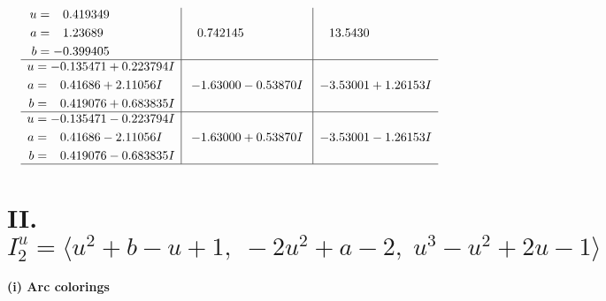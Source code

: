 \documentclass[1p]{elsarticle_modified}
\theoremstyle{definition}
\begin{document}
$$\begin{array}{c|c|c}
\begin{aligned}
u &= \phantom{-}0.419349\phantom{ +0.000000I} \\
a &= \phantom{-}1.23689\phantom{ +0.000000I} \\
b &= -0.399405\phantom{ +0.000000I}\end{aligned}
 & \phantom{-}0.742145\phantom{ +0.000000I} & \phantom{-}13.5430\phantom{ +0.000000I} \\ \hline\begin{aligned}
u &= -0.135471 + 0.223794 I \\
a &= \phantom{-}0.41686 + 2.11056 I \\
b &= \phantom{-}0.419076 + 0.683835 I\end{aligned}
 & -1.63000 - 0.53870 I & -3.53001 + 1.26153 I \\ \hline\begin{aligned}
u &= -0.135471 - 0.223794 I \\
a &= \phantom{-}0.41686 - 2.11056 I \\
b &= \phantom{-}0.419076 - 0.683835 I\end{aligned}
 & -1.63000 + 0.53870 I & -3.53001 - 1.26153 I\\
 \hline 
 \end{array}$$\newpage\newpage\renewcommand{\arraystretch}{1}
\centering \section*{II. $I^u_{2}= \langle u^2+b- u+1,\;-2 u^2+a-2,\;u^3- u^2+2 u-1 \rangle$}
\flushleft \textbf{(i) Arc colorings}\\
\end{document}
